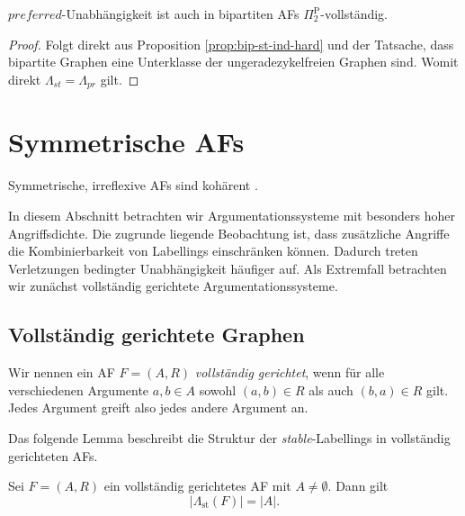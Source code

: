 \begin{Proposition}
    \label{prop:bip-prf-ind-hard}
    \(preferred\)-Unabhängigkeit ist auch in bipartiten AFs \(\Pi_2^\text{P}\)-vollständig.
\end{Proposition}

\begin{proof}
    Folgt direkt aus Proposition \ref{prop:bip-st-ind-hard} und der Tatsache, dass 
    bipartite Graphen eine Unterklasse der ungeradezykelfreien Graphen sind. Womit direkt
    \(\Lambda_{st} = \Lambda_{pr}\) gilt. 
\end{proof}

\section{Symmetrische AFs}
\label{sec:sym-afs}

Symmetrische, irreflexive AFs sind kohärent \textcite{Coste:2005:symmetric-af-irflx-coherent}.

In diesem Abschnitt betrachten wir Argumentationssysteme mit besonders hoher
Angriffsdichte. Die zugrunde liegende Beobachtung ist, dass zusätzliche Angriffe
die Kombinierbarkeit von Labellings einschränken können. Dadurch treten
Verletzungen bedingter Unabhängigkeit häufiger auf. Als Extremfall betrachten
wir zunächst vollständig gerichtete Argumentationssysteme.

\subsection{Vollständig gerichtete Graphen}
\label{subsec:cdg-afs}

Wir nennen ein AF \(F=(A,R)\) \emph{vollständig gerichtet}, wenn für alle
verschiedenen Argumente \(a,b\in A\) sowohl \((a,b)\in R\) als auch
\((b,a)\in R\) gilt. Jedes Argument greift also jedes andere Argument an.

Das folgende Lemma beschreibt die Struktur der \textit{stable}-Labellings in
vollständig gerichteten AFs.

\begin{Lemma}
    \label{lem:cdg-afs-labellings}
    Sei \(F=(A,R)\) ein vollständig gerichtetes AF mit \(A\neq\emptyset\).
    Dann gilt
    \[
        |\Lambda_{\mathrm{st}}(F)|=|A|.
    \]
\end{Lemma}

